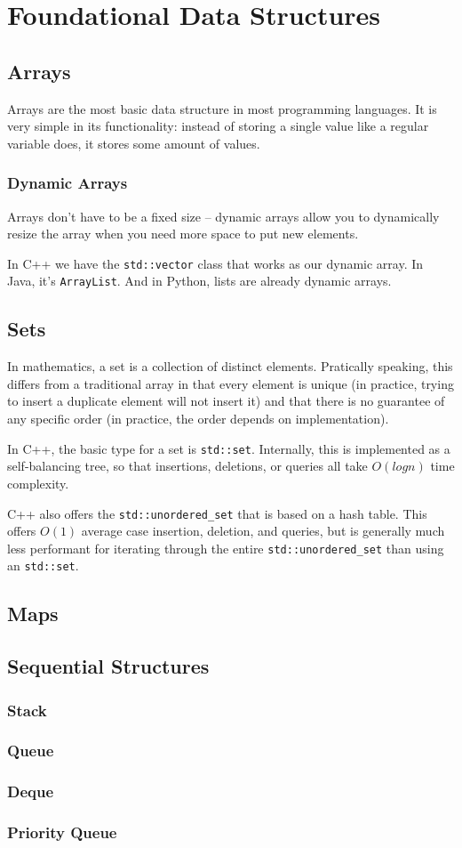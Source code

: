 \section{Foundational Data Structures}
\subsection{Arrays}

Arrays are the most basic data structure in most programming languages. It is very simple in its functionality: instead of storing a single value like a regular variable does, it stores some amount of values.

\subsubsection{Dynamic Arrays}

Arrays don't have to be a fixed size -- dynamic arrays allow you to dynamically resize the array when you need more space to put new elements.

In C++ we have the \texttt{std::vector} class that works as our dynamic array. In Java, it's \texttt{ArrayList}. And in Python, lists are already dynamic arrays.

\subsection{Sets}

In mathematics, a set is a collection of distinct elements. Pratically speaking, this differs from a traditional array in that every element is unique (in practice, trying to insert a duplicate element will not insert it) and that there is no guarantee of any specific order (in practice, the order depends on implementation).

In C++, the basic type for a set is \texttt{std::set}. Internally, this is implemented as a self-balancing tree, so that insertions, deletions, or queries all take $O(log n)$ time complexity.

C++ also offers the \texttt{std::unordered_set} that is based on a hash table. This offers $O(1)$ average case insertion, deletion, and queries, but is generally much less performant for iterating through the entire \texttt{std::unordered_set} than using an \texttt{std::set}.

\subsection{Maps}
\subsection{Sequential Structures}
\subsubsection{Stack}
\subsubsection{Queue}
\subsubsection{Deque}
\subsubsection{Priority Queue}